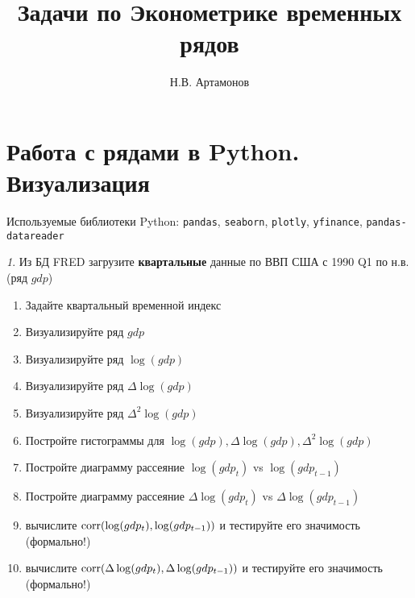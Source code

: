 \documentclass[12pt]{article}
\title{Задачи по Эконометрике временных рядов}
\author{Н.В. Артамонов}
\theoremstyle{remark}
\newtheorem{exercise}{}[subsection]
\begin{document}
\maketitle

\tableofcontents

\section{Работа с рядами в Python. Визуализация}

Используемые библиотеки Python: \texttt{pandas}, \texttt{seaborn}, 
\texttt{plotly}, \texttt{yfinance}, \texttt{pandas-datareader}

\begin{exercise}
Из БД FRED загрузите \textbf{квартальные} данные по ВВП США с 1990 Q1 по н.в. (ряд \(gdp\))
\begin{enumerate}
	\item Задайте квартальный временной индекс
	\item Визуализируйте ряд \(gdp\)
	\item Визуализируйте ряд \(\log(gdp)\)
	\item Визуализируйте ряд \(\Delta\log(gdp)\)
	\item Визуализируйте ряд \(\Delta^2\log(gdp)\)
	\item Постройте гистограммы для \(\log(gdp),\Delta\log(gdp),\Delta^2\log(gdp)\)
	\item Постройте диаграмму рассеяние \(\log(gdp_t)\) vs \(\log(gdp_{t-1})\)
	\item Постройте диаграмму рассеяние \(\Delta\log(gdp_t)\) vs \(\Delta\log(gdp_{t-1})\)
	\item вычислите \(\operatorname{corr}(\log(gdp_t), \log(gdp_{t-1}))\) и 
	тестируйте его значимость (формально!)
	\item вычислите \(\operatorname{corr}(\Delta\log(gdp_t), \Delta\log(gdp_{t-1}))\) и 
	тестируйте его значимость (формально!) 
\end{enumerate}
\end{exercise}
\end{document}
